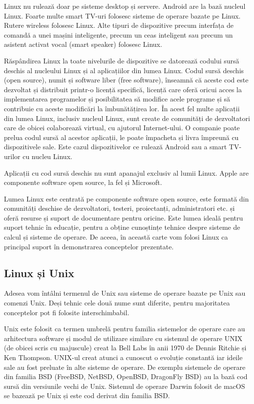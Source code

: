 Linux nu rulează doar pe sisteme desktop și servere. Android are la bază nucleul Linux. Foarte multe smart TV-uri folosesc sisteme de operare bazate pe Linux. Rutere wireless folosesc Linux. Alte tipuri de dispozitive precum interfața de comandă a unei mașini inteligente, precum un ceas inteligent sau precum un asistent activat vocal (smart speaker) folosesc Linux.

Răspândirea Linux la toate nivelurile de dispozitive se datorează codului sursă deschis al nucleului Linux și al aplicațiilor din lumea Linux. Codul sursă deschis (open source), numit și software liber (free software), înseamnă că aceste cod este dezvoltat și distribuit printr-o licență specifică, licență care oferă oricui acces la implementarea programelor și posibilitatea să modifice acele programe și să contribuie cu aceste modificări la îmbunătățirea lor. În acest fel multe aplicații din lumea Linux, inclusiv nucleul Linux, sunt create de comunități de dezvoltatori care de obicei colaborează virtual, cu ajutorul Internet-ului. O companie poate prelua codul sursă al acestor aplicații, le poate împacheta și livra împreună cu dispozitivele sale. Este cazul dispozitivelor ce rulează Android sau a smart TV-urilor cu nucleu Linux.

Aplicații cu cod sursă deschis nu sunt apanajul exclusiv al lumii Linux. Apple are componente software open source, la fel și Microsoft.

Lumea Linux este centrată pe componente software open source, este formată din comunități deschise de dezvoltatori, testeri, proiectanți, administratori etc. și oferă resurse și suport de documentare pentru oricine. Este lumea ideală pentru suport tehnic în educație, pentru a obține cunoștințe tehnice despre sisteme de calcul și sisteme de operare. De aceea, în această carte vom folosi Linux ca principal suport în demonstrarea conceptelor prezentate.

\subsection{Linux și Unix}
\label{sec:intro:linux-unix}

Adesea vom întâlni termenul de Unix sau sisteme de operare bazate pe Unix sau comenzi Unix. Deși tehnic cele două nume sunt diferite, pentru majoritatea conceptelor pot fi folosite interschimbabil.

Unix este folosit ca termen umbrelă pentru familia sistemelor de operare care au arhitectura software și modul de utilizare similare cu sistemul de operare UNIX (de obicei scris cu majuscule) creat la Bell Labs în anii 1970 de Dennis Ritchie și Ken Thompson. UNIX-ul creat atunci a cunoscut o evoluție constantă iar ideile sale au fost preluate în alte sisteme de operare. De exemplu sistemele de operare din familia BSD (FreeBSD, NetBSD, OpenBSD, DragonFly BSD) au la bază cod sursă din versiunile vechi de Unix. Sistemul de operare Darwin folosit de macOS se bazează pe Unix și este cod derivat din familia BSD.

